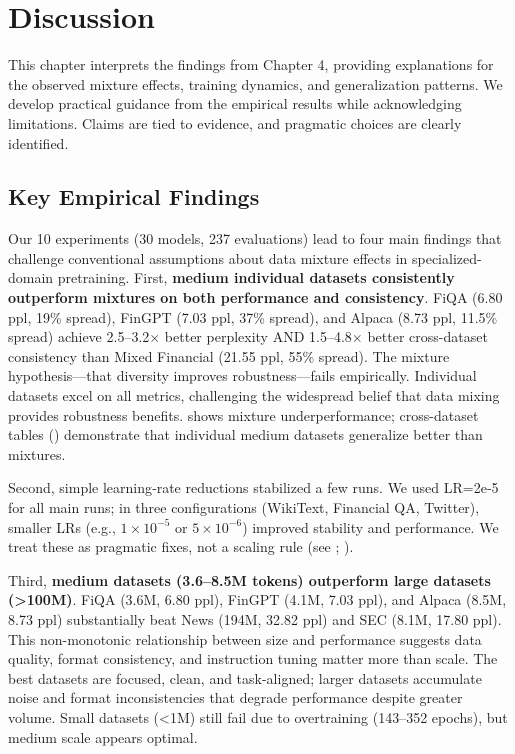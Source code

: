 \chapter{Discussion}

This chapter interprets the findings from Chapter 4, providing explanations for the observed mixture effects, training dynamics, and generalization patterns. We develop practical guidance from the empirical results while acknowledging limitations. Claims are tied to evidence, and pragmatic choices are clearly identified.

\section{Key Empirical Findings}

Our 10 experiments (30 models, 237 evaluations) lead to four main findings that challenge conventional assumptions about data mixture effects in specialized-domain pretraining. First, \textbf{medium individual datasets consistently outperform mixtures on both performance and consistency}. FiQA (6.80 ppl, 19\% spread), FinGPT (7.03 ppl, 37\% spread), and Alpaca (8.73 ppl, 11.5\% spread) achieve 2.5–3.2$\times$ better perplexity AND 1.5–4.8$\times$ better cross-dataset consistency than Mixed Financial (21.55 ppl, 55\% spread). The mixture hypothesis—that diversity improves robustness—fails empirically. Individual datasets excel on all metrics, challenging the widespread belief that data mixing provides robustness benefits.  shows mixture underperformance; cross-dataset tables () demonstrate that individual medium datasets generalize better than mixtures.

Second, simple learning‑rate reductions stabilized a few runs. We used LR=2e‑5 for all main runs; in three configurations (WikiText, Financial QA, Twitter), smaller LRs (e.g., $1\times10^{-5}$ or $5\times10^{-6}$) improved stability and performance. We treat these as pragmatic fixes, not a scaling rule (see ; ).

Third, \textbf{medium datasets (3.6–8.5M tokens) outperform large datasets (>100M)}. FiQA (3.6M, 6.80 ppl), FinGPT (4.1M, 7.03 ppl), and Alpaca (8.5M, 8.73 ppl) substantially beat News (194M, 32.82 ppl) and SEC (8.1M, 17.80 ppl). This non-monotonic relationship between size and performance suggests data quality, format consistency, and instruction tuning matter more than scale. The best datasets are focused, clean, and task-aligned; larger datasets accumulate noise and format inconsistencies that degrade performance despite greater volume. Small datasets (<1M) still fail due to overtraining (143–352 epochs), but medium scale appears optimal.

